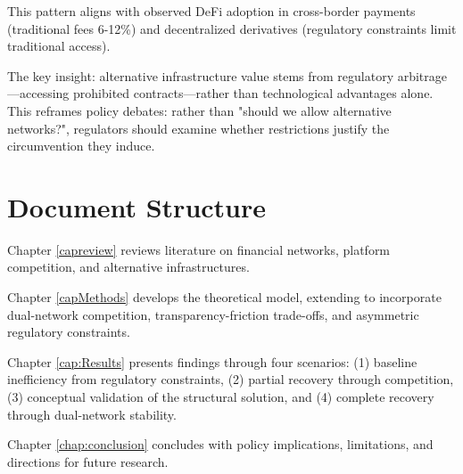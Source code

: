 This pattern aligns with observed DeFi adoption in cross-border payments (traditional fees 6-12\%) and decentralized derivatives (regulatory constraints limit traditional access).

The key insight: alternative infrastructure value stems from regulatory arbitrage—accessing prohibited contracts—rather than technological advantages alone. This reframes policy debates: rather than "should we allow alternative networks?", regulators should examine whether restrictions justify the circumvention they induce.

\section{Document Structure}

Chapter \ref{capreview} reviews literature on financial networks, platform competition, and alternative infrastructures.

Chapter \ref{capMethods} develops the theoretical model, extending  to incorporate dual-network competition, transparency-friction trade-offs, and asymmetric regulatory constraints.

Chapter \ref{cap:Results} presents findings through four scenarios: (1) baseline inefficiency from regulatory constraints, (2) partial recovery through competition, (3) conceptual validation of the structural solution, and (4) complete recovery through dual-network stability.

Chapter \ref{chap:conclusion} concludes with policy implications, limitations, and directions for future research.